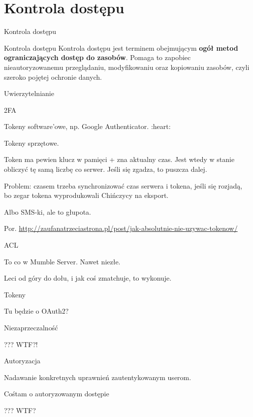 \section{Kontrola dostępu}

\begin{frame}{Kontrola dostępu}
		\begin{alertblock}{Kontrola dostępu}
			Kontrola dostępu jest terminem obejmującym \textbf{ogół metod ograniczających dostęp do zasobów}.
			Pomaga to zapobiec nieautoryzowanemu przeglądaniu, modyfikowaniu oraz kopiowaniu zasobów, czyli szeroko pojętej ochronie danych. 
		\end{alertblock}		
\end{frame}


\begin{frame}{Uwierzytelnianie}

\end{frame}

\begin{frame}{2FA}
	
	Tokeny software'owe, np. Google Authenticator. :heart: %
	
	Tokeny sprzętowe.
	
	Token ma pewien klucz w pamięci + zna aktualny czas. Jest wtedy w stanie obliczyć tę samą liczbę co serwer. Jeśli się zgadza, to puszcza dalej.
	
	Problem: czasem trzeba synchronizować czas serwera i tokena, jeśli się rozjadą, bo zegar tokena wyprodukowali Chińczycy na eksport.
	
	Albo SMS-ki, ale to głupota.
	
	Por. \url{http://zaufanatrzeciastrona.pl/post/jak-absolutnie-nie-uzywac-tokenow/}
	
\end{frame}

\begin{frame}{ACL}
	
	To co w Mumble Server. Nawet niezłe.
	
	Leci od góry do dołu, i jak coś zmatchuje, to wykonuje.
	
\end{frame}

\begin{frame}{Tokeny}
	
	Tu będzie o OAuth2?
	
\end{frame}

\begin{frame}{Niezaprzeczalność}
	
	??? WTF?!
	
\end{frame}

\begin{frame}{Autoryzacja}
	
	Nadawanie konkretnych uprawnień zautentykowanym userom.
	
\end{frame}

\begin{frame}{Cośtam o autoryzowanym dostępie}
	
	??? WTF?
	
\end{frame}


